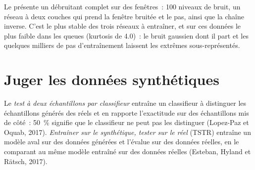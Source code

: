Le  présente un  débruitant complet sur des fenêtres~: 100 niveaux de bruit, un réseau à deux couches qui
prend la fenêtre bruitée et le pas, ainsi que la chaîne inverse. C'est le plus stable des trois réseaux à entraîner, et sur ces données
le plus faible dans les queues (kurtosis de 4.0)~: le bruit gaussien dont il part et les quelques milliers de pas d'entraînement
laissent les extrêmes sous-représentés.

\section{Juger les données synthétiques}

\begin{definition}\label{def:ml:generative-models-and-synthetic-data:tests}
Le \emph{test à deux échantillons par classifieur} entraîne un classifieur à distinguer les échantillons générés des
réels et en rapporte l'exactitude sur des échantillons mis de côté~: 50~\% signifie que le classifieur ne peut pas les distinguer (Lopez-Paz et
Oquab, 2017). \emph{Entraîner sur le synthétique, tester sur le réel} (TSTR) entraîne un modèle aval
sur des données générées et l'évalue sur des données réelles, en le comparant au même modèle entraîné sur des données réelles (Esteban, Hyland et
Rätsch, 2017).
\end{definition}

